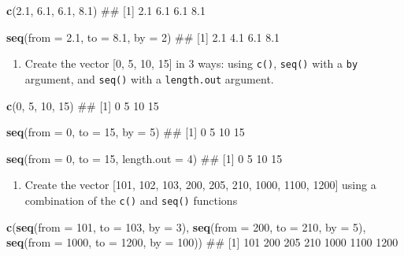 \documentclass[]{book}
\newenvironment{Shaded}{\begin{snugshade}}{\end{snugshade}}
\newcommand{\KeywordTok}[1]{\textcolor[rgb]{0.13,0.29,0.53}{\textbf{#1}}}
\newcommand{\DataTypeTok}[1]{\textcolor[rgb]{0.13,0.29,0.53}{#1}}
\newcommand{\DecValTok}[1]{\textcolor[rgb]{0.00,0.00,0.81}{#1}}
\newcommand{\FloatTok}[1]{\textcolor[rgb]{0.00,0.00,0.81}{#1}}
\newcommand{\NormalTok}[1]{#1}
\providecommand{\tightlist}{%
  \setlength{\itemsep}{0pt}\setlength{\parskip}{0pt}}
\theoremstyle{definition}
\theoremstyle{definition}
\theoremstyle{remark}
\begin{document}
\begin{Shaded}
\begin{Highlighting}[]

\KeywordTok{c}\NormalTok{(}\FloatTok{2.1}\NormalTok{, }\FloatTok{6.1}\NormalTok{, }\FloatTok{6.1}\NormalTok{, }\FloatTok{8.1}\NormalTok{)}
\NormalTok{## [1] 2.1 6.1 6.1 8.1}

\KeywordTok{seq}\NormalTok{(}\DataTypeTok{from =} \FloatTok{2.1}\NormalTok{, }\DataTypeTok{to =} \FloatTok{8.1}\NormalTok{, }\DataTypeTok{by =} \DecValTok{2}\NormalTok{)}
\NormalTok{## [1] 2.1 4.1 6.1 8.1}
\end{Highlighting}
\end{Shaded}

\begin{enumerate}
\def\labelenumi{\arabic{enumi}.}
\setcounter{enumi}{2}
\tightlist
\item
  Create the vector {[}0, 5, 10, 15{]} in 3 ways: using \texttt{c()},
  \texttt{seq()} with a \texttt{by} argument, and \texttt{seq()} with a
  \texttt{length.out} argument.
\end{enumerate}

\begin{Shaded}
\begin{Highlighting}[]
\KeywordTok{c}\NormalTok{(}\DecValTok{0}\NormalTok{, }\DecValTok{5}\NormalTok{, }\DecValTok{10}\NormalTok{, }\DecValTok{15}\NormalTok{)}
\NormalTok{## [1]  0  5 10 15}

\KeywordTok{seq}\NormalTok{(}\DataTypeTok{from =} \DecValTok{0}\NormalTok{, }\DataTypeTok{to =} \DecValTok{15}\NormalTok{, }\DataTypeTok{by =} \DecValTok{5}\NormalTok{)}
\NormalTok{## [1]  0  5 10 15}

\KeywordTok{seq}\NormalTok{(}\DataTypeTok{from =} \DecValTok{0}\NormalTok{, }\DataTypeTok{to =} \DecValTok{15}\NormalTok{, }\DataTypeTok{length.out =} \DecValTok{4}\NormalTok{)}
\NormalTok{## [1]  0  5 10 15}
\end{Highlighting}
\end{Shaded}

\begin{enumerate}
\def\labelenumi{\arabic{enumi}.}
\setcounter{enumi}{3}
\tightlist
\item
  Create the vector {[}101, 102, 103, 200, 205, 210, 1000, 1100, 1200{]}
  using a combination of the \texttt{c()} and \texttt{seq()} functions
\end{enumerate}

\begin{Shaded}
\begin{Highlighting}[]
\KeywordTok{c}\NormalTok{(}\KeywordTok{seq}\NormalTok{(}\DataTypeTok{from =} \DecValTok{101}\NormalTok{, }\DataTypeTok{to =} \DecValTok{103}\NormalTok{, }\DataTypeTok{by =} \DecValTok{3}\NormalTok{), }
  \KeywordTok{seq}\NormalTok{(}\DataTypeTok{from =} \DecValTok{200}\NormalTok{, }\DataTypeTok{to =} \DecValTok{210}\NormalTok{, }\DataTypeTok{by =} \DecValTok{5}\NormalTok{), }
  \KeywordTok{seq}\NormalTok{(}\DataTypeTok{from =} \DecValTok{1000}\NormalTok{, }\DataTypeTok{to =} \DecValTok{1200}\NormalTok{, }\DataTypeTok{by =} \DecValTok{100}\NormalTok{))}
\NormalTok{## [1]  101  200  205  210 1000 1100 1200}
\end{Highlighting}
\end{Shaded}
\end{document}
